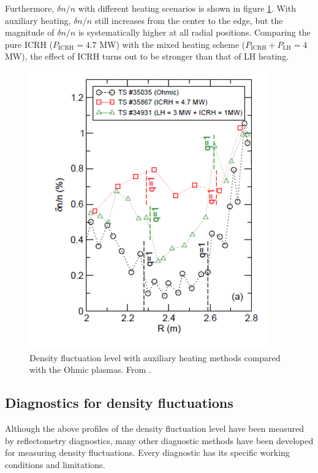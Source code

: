 Furthermore, $\delta n/n$ with different heating scenarios is shown in figure \ref{fig:fluc_level_heating}. With auxiliary heating, $\delta n/n$ still increases from the center to the edge, but the magnitude of $\delta n/n$ is systematically higher at all radial positions. Comparing the pure ICRH ($P_\mathrm{ICRH} = 4.7$ MW) with the mixed heating scheme ($P_\mathrm{ICRH} + P_\mathrm{LH} = 4$ MW), the effect of ICRH turns out to be stronger than that of LH heating.



\begin{figure}[!h]
\begin{centering}
\includegraphics[scale=0.6]{fluc_level_heating_2.png}
\par\end{centering}
\caption{Density fluctuation level with auxiliary heating methods compared with the Ohmic plasmas. From \cite{Sirinelli_2006_Thesis}.}
\label{fig:fluc_level_heating}
\end{figure}


\subsection{Diagnostics for density fluctuations}

Although the above profiles of the density fluctuation level have been measured by reflectometry diagnostics, many other diagnostic methods have been developed for measuring density fluctuations. Every diagnostic has its specific working conditions and limitations.

